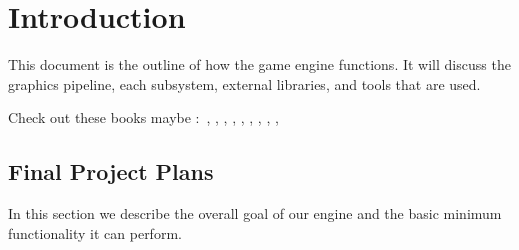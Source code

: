 \section{Introduction}

This document is the outline of how the game engine functions.  It will discuss the graphics pipeline, each subsystem, external libraries, and tools that are used.

Check out these books maybe :~\cite{B_GEA}, \cite{B_RTR}, \cite{B_RTC}, \cite{B_3D_GED}, \cite{B_3D_GEA}, \cite{B_INT_CMP_GPH}, \cite{B_MTH_FOR_3D}, \cite{B_ESS_MTH}, \cite{B_CMP_GEO},

\subsection{Final Project Plans}

In this section we describe the overall goal of our engine and the basic minimum functionality it can perform.
